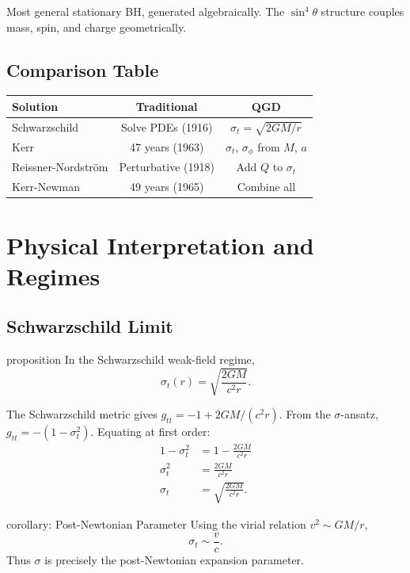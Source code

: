 \documentclass[11pt,a4paper]{article}
\theoremstyle{definition}
\theoremstyle{remark}
\begin{document}
	Most general stationary BH, generated algebraically. The $\sin^4\theta$ structure couples mass, spin, and charge geometrically.
	
	\subsection{Comparison Table}
	
	\begin{center}
		\begin{tabular}{|l|c|c|}
			\hline
			\textbf{Solution} & \textbf{Traditional} & \textbf{QGD} \\
			\hline
			Schwarzschild & Solve PDEs (1916) & $\sigma_t = \sqrt{2GM/r}$ \\
			Kerr & 47 years (1963) & $\sigma_t$, $\sigma_\phi$ from $M$, $a$ \\
			Reissner-Nordström & Perturbative (1918) & Add $Q$ to $\sigma_t$ \\
			Kerr-Newman & 49 years (1965) & Combine all \\
			\hline
		\end{tabular}
	\end{center}
	
	\section{Physical Interpretation and Regimes}
	
	\subsection{Schwarzschild Limit}
	
	proposition
		In the Schwarzschild weak-field regime,
		\begin{equation}
			\sigma_t(r) = \sqrt{\frac{2GM}{c^2 r}}.
		\end{equation}
	
		The Schwarzschild metric gives $g_{tt} = -1 + 2GM/(c^2r)$. From the $\sigma$-ansatz, $g_{tt} = -(1 - \sigma_t^2)$. Equating at first order:
		\begin{align}
			1 - \sigma_t^2 &= 1 - \frac{2GM}{c^2 r}\\
			\sigma_t^2 &= \frac{2GM}{c^2 r}\\
			\sigma_t &= \sqrt{\frac{2GM}{c^2 r}}.
		\end{align}
	
	corollary: Post-Newtonian Parameter
		Using the virial relation $v^2 \sim GM/r$,
		\begin{equation}
			\sigma_t \sim \frac{v}{c}.
		\end{equation}
		Thus $\sigma$ is precisely the post-Newtonian expansion parameter.
	
\end{document}
